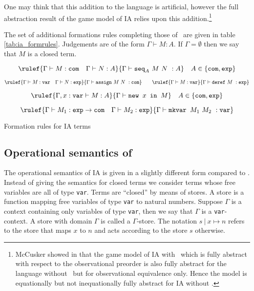 One may think that this addition to the language is artificial, however the full abstraction result of the game model of IA relies upon this addition.\footnote{McCusker showed in \cite{mccusker2001} that the game model of IA with \iamkvar\ which is fully abstract with respect to the observational preorder is also fully abstract for the language without \iamkvar\, but for observational equivalence only. Hence the model is equationally but not inequationally fully abstract for IA without \iamkvar .}

The set of additional formations rules completing those of \pcf\ are
given in table \ref{tab:ia_formrules}. Judgements are of the form
$\Gamma \vdash M : A$. If $\Gamma = \emptyset$ then we say that $M$
is a closed term.

\begin{table}[htbp]
$$ \rulef{\Gamma \vdash M : \texttt{com} \quad \Gamma \vdash N :A}
    {\Gamma \vdash \texttt{seq}_A \ M\ N\ : A} \quad A \in \{ \texttt{com}, \texttt{exp}\}$$

$$ \rulef{\Gamma \vdash M : \texttt{var} \quad \Gamma \vdash N : \texttt{exp}}
    {\Gamma \vdash \texttt{assign}\ M\ N\ : \texttt{com}}
\qquad
 \rulef{\Gamma \vdash M : \texttt{var}}
    {\Gamma \vdash \texttt{deref}\ M\ : \texttt{exp}}$$

$$ \rulef{\Gamma, x : \texttt{var} \vdash M : A}
    {\Gamma \vdash \texttt{new } x \texttt{ in } M} \quad A \in \{ \texttt{com}, \texttt{exp}\}$$

$$ \rulef{\Gamma \vdash M_1 : \texttt{exp} \rightarrow \texttt{com} \quad \Gamma \vdash M_2 : \texttt{exp}}
    {\Gamma \vdash \texttt{mkvar } M_1\ M_2\ : \texttt{var}}$$

\caption{Formation rules for IA terms}
\label{tab:ia_formrules}
\end{table}


\subsection{Operational semantics of \ialgol}

The operational semantics of IA is given in a slightly different
form compared to \pcf. Instead of giving the semantics for closed
terms we consider terms whose free variables are all of type
\texttt{var}. Terms are ``closed'' by means of stores. A store is a
function mapping free variables of type \texttt{var} to natural
numbers. Suppose $\Gamma$ is a context containing only variables of
type \texttt{var}, then we say that $\Gamma$ is a
\texttt{var}-context. A store with domain $\Gamma$ is called a
$\Gamma$-store. The notation $s\ |\ x \mapsto n$ refers to the store
that maps $x$ to $n$ and acts according to the store $s$ otherwise.

